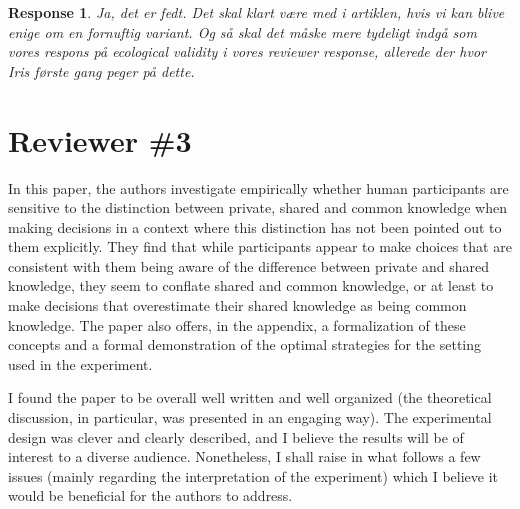 \documentclass[a4paper]{article}
\newtheorem{response}{Response}
\newenvironment{tobo}{\smallskip \noindent \color{yellow!80!black!80}}{\color{black}\smallskip}
\begin{document}
\begin{response}
\begin{tobo}
Ja, det er fedt. Det skal klart være med i artiklen, hvis vi kan blive enige om en fornuftig variant. Og så skal det måske mere tydeligt indgå som vores respons på ecological validity i vores reviewer response, allerede der hvor Iris første gang peger på dette. 
\end{tobo}

\end{response}


\section{Reviewer \#3}
 In this paper, the authors investigate empirically whether human participants are sensitive to the distinction between private, shared and common knowledge when making decisions in a context where this distinction has not been pointed out to them explicitly. They find that while participants appear to make choices that are consistent with them being aware of the difference between private and shared knowledge, they seem to conflate shared and common knowledge, or at least to make decisions that overestimate their shared knowledge as being common knowledge. The paper also offers, in the appendix, a formalization of these concepts and a formal demonstration of the optimal strategies for the setting used in the experiment.

I found the paper to be overall well written and well organized (the theoretical discussion, in particular, was presented in an engaging way). The experimental design was clever and clearly described, and I believe the results will be of interest to a diverse audience. Nonetheless, I shall raise in what follows a few issues (mainly regarding the interpretation of the experiment) which I believe it would be beneficial for the authors to address.
\end{document}
